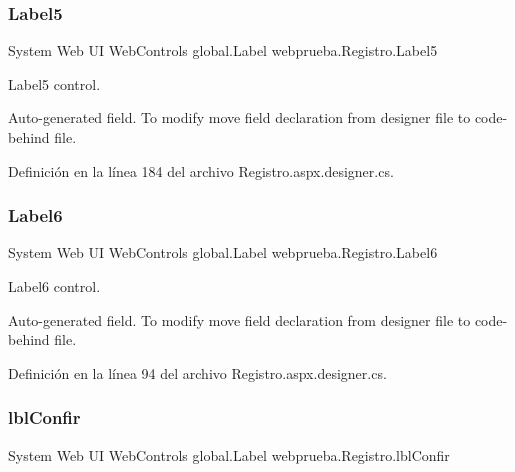 \subsubsection{\texorpdfstring{Label5}{Label5}}
{\footnotesize\ttfamily System Web UI Web\+Controls global.\+Label webprueba.\+Registro.\+Label5\hspace{0.3cm}{\ttfamily [protected]}}



Label5 control. 

Auto-\/generated field. To modify move field declaration from designer file to code-\/behind file. 

Definición en la línea 184 del archivo Registro.\+aspx.\+designer.\+cs.

\mbox{\label{classwebprueba_1_1_registro_ac533d063bb060371d823963fcb1a1f24}} 
\subsubsection{\texorpdfstring{Label6}{Label6}}
{\footnotesize\ttfamily System Web UI Web\+Controls global.\+Label webprueba.\+Registro.\+Label6\hspace{0.3cm}{\ttfamily [protected]}}



Label6 control. 

Auto-\/generated field. To modify move field declaration from designer file to code-\/behind file. 

Definición en la línea 94 del archivo Registro.\+aspx.\+designer.\+cs.

\mbox{\label{classwebprueba_1_1_registro_a42bc2caf84771b1b7e73df6e3af943f1}} 
\subsubsection{\texorpdfstring{lblConfir}{lblConfir}}
{\footnotesize\ttfamily System Web UI Web\+Controls global.\+Label webprueba.\+Registro.\+lbl\+Confir\hspace{0.3cm}{\ttfamily [protected]}}



